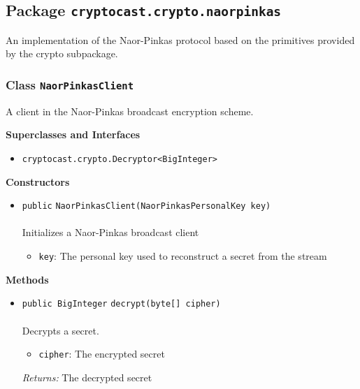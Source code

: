 \subsection{Package \lstinline!cryptocast.crypto.naorpinkas!}
An implementation of the Naor-Pinkas protocol based on the primitives provided by the crypto
 subpackage.

\subsubsection{Class \lstinline|NaorPinkasClient|}
A client in the Naor-Pinkas broadcast encryption scheme. \\
\noindent\begin{minipage}[t]{5cm}
\vspace{0.3em}
\hspace*{2em}
\vspace{0.3em}
\end{minipage}



\textbf{\sffamily Superclasses and Interfaces}
\begin{itemize}
\item \lstinline|cryptocast.crypto.Decryptor<BigInteger>|
\end{itemize}


\textbf{\sffamily Constructors}
\begin{itemize}
\item \lstinline|public| \lstinline|NaorPinkasClient|\lstinline|(NaorPinkasPersonalKey key)|\\ \\[-0.6em]
Initializes a Naor-Pinkas broadcast client
\begin{itemize}
\item \lstinline|key|: The personal key used to reconstruct a secret from the stream
\end{itemize}



\end{itemize}


\textbf{\sffamily Methods}
\begin{itemize}
\item \lstinline|public BigInteger| \lstinline|decrypt|\lstinline|(byte[] cipher)|\\ \\[-0.6em]
Decrypts a secret.
\begin{itemize}
\item \lstinline|cipher|: The encrypted secret
\end{itemize}

\emph{Returns:} The decrypted secret

\end{itemize}

